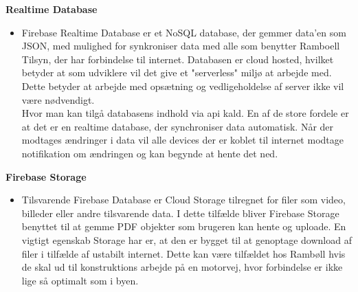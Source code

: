 \textbf{Realtime Database\cite{FirebaseRealtimeDB}}
\begin{itemize}[-]
	\itemsep 0.3em 
	\item[]  Firebase Realtime Database er et NoSQL database, der gemmer data'en som JSON\cite{JSON}, med mulighed for synkroniser data med alle som benytter Ramboell Tilsyn, der har forbindelse til internet. Databasen er cloud hosted, hvilket betyder at som udviklere vil det give et "serverless" miljø at arbejde med. Dette betyder at arbejde med opsætning og vedligeholdelse af server ikke vil være nødvendigt. \\ Hvor man kan tilgå databasens indhold via api kald. 
	En af de store fordele er at det er en realtime database, der synchroniser data automatisk. Når der modtages ændringer i data vil alle devices der er koblet til internet modtage notifikation om ændringen og kan begynde at hente det ned. 
\end{itemize}

\textbf{Firebase Storage\cite{FirebaseStorage}}
\begin{itemize}[-]
	\itemsep 0.3em 
	\item[] Tilsvarende Firebase Database er Cloud Storage tilregnet for filer som video, billeder eller andre tilsvarende data. I dette tilfælde bliver Firebase Storage benyttet til at gemme PDF objekter som brugeren kan hente og uploade. En vigtigt egenskab Storage har er, at den er bygget til at genoptage download af filer i tilfælde af ustabilt internet. Dette kan være tilfældet hos Rambøll hvis de skal ud til konstruktions arbejde på en motorvej, hvor forbindelse er ikke lige så optimalt som i byen. \\
\end{itemize}
\clearpage

